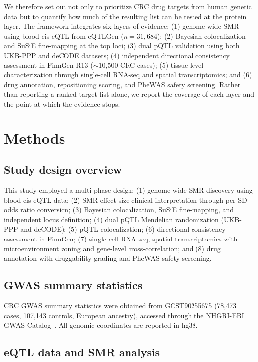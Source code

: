 \documentclass[11pt,a4paper]{article}
\begin{document}
We therefore set out not only to prioritize CRC drug targets from human genetic
data but to quantify how much of the resulting list can be tested at the protein
layer. The framework integrates six layers of evidence: (1) genome-wide SMR using blood cis-eQTL
from eQTLGen ($n=31,684$); (2) Bayesian colocalization and SuSiE
fine-mapping at the top loci; (3) dual pQTL validation using both UKB-PPP and
deCODE datasets; (4) independent directional consistency assessment in FinnGen R13 ($\sim$10,500 CRC
cases); (5) tissue-level characterization through single-cell RNA-seq and spatial
transcriptomics; and (6) drug annotation, repositioning scoring, and PheWAS
safety screening. Rather than reporting a ranked target list alone, we report the
coverage of each layer and the point at which the evidence stops.

\section{Methods}

\subsection{Study design overview}

This study employed a multi-phase design: (1) genome-wide SMR discovery using
blood cis-eQTL data; (2) SMR effect-size clinical interpretation through per-SD
odds ratio conversion; (3) Bayesian colocalization, SuSiE fine-mapping, and
independent locus definition; (4) dual pQTL Mendelian randomization (UKB-PPP and
deCODE); (5) pQTL colocalization; (6) directional consistency assessment in FinnGen;
(7) single-cell RNA-seq, spatial transcriptomics with microenvironment zoning
and gene-level cross-correlation; and (8) drug annotation with druggability
grading and PheWAS safety screening.

\subsection{GWAS summary statistics}

CRC GWAS summary statistics were obtained from GCST90255675 (78,473 cases,
107,143 controls, European ancestry), accessed through the NHGRI-EBI GWAS
Catalog~\cite{sollis2023gwas}. All genomic coordinates are reported
in hg38.

\subsection{eQTL data and SMR analysis}
\end{document}
